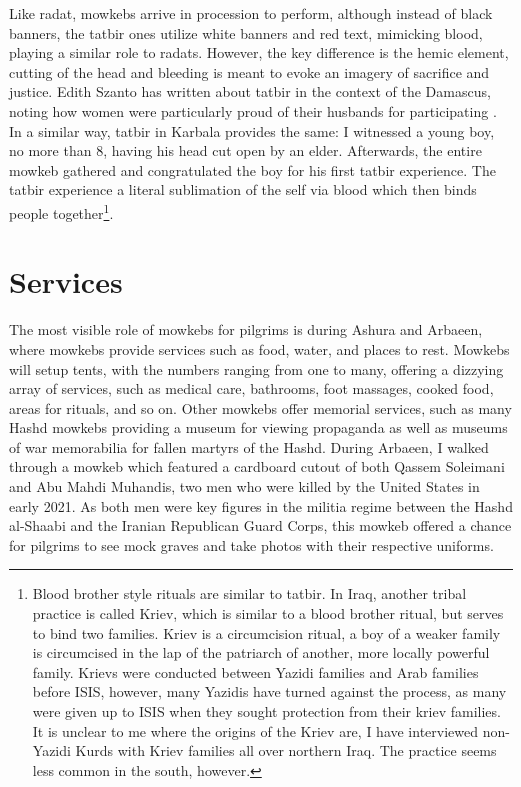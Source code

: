 Like radat, mowkebs arrive in procession to perform, although instead of black banners, the tatbir ones utilize white banners and red text, mimicking blood, playing a similar role to radats. However, the key difference is the hemic element, cutting of the head and bleeding is meant to evoke an imagery of sacrifice and justice. Edith Szanto has written about tatbir in the context of the Damascus, noting how women were particularly proud of their husbands for participating \cite[86]{szanto_beyond_2013}. In a similar way, tatbir in Karbala provides the same: I witnessed a young boy, no more than 8, having his head cut open by an elder. Afterwards, the entire mowkeb gathered and congratulated the boy for his first tatbir experience. The tatbir experience a literal sublimation of the self via blood which then binds people together\footnote{Blood brother style rituals are similar to tatbir. In Iraq, another tribal practice is called Kriev, which is similar to a blood brother ritual, but serves to bind two families. Kriev is a circumcision ritual, a boy of a weaker family is circumcised in the lap of the patriarch of another, more locally powerful family. Krievs were conducted between Yazidi families and Arab families before ISIS, however, many Yazidis have turned against the process, as many were given up to ISIS when they sought protection from their kriev families. It is unclear to me where the origins of the Kriev are, I have interviewed non-Yazidi Kurds with Kriev families all over northern Iraq. The practice seems less common in the south, however.}. 

\section{Services}
The most visible role of mowkebs for pilgrims is during Ashura and Arbaeen, where mowkebs provide services such as food, water, and places to rest. Mowkebs will setup tents, with the numbers ranging from one to many, offering a dizzying array of services, such as medical care, bathrooms, foot massages, cooked food, areas for rituals, and so on. Other mowkebs offer memorial services, such as many Hashd mowkebs providing a museum for viewing propaganda as well as museums of war memorabilia for fallen martyrs of the Hashd. During Arbaeen, I walked through a mowkeb which featured a cardboard cutout of both Qassem Soleimani and Abu Mahdi Muhandis, two men who were killed by the United States in early 2021. As both men were key figures in the militia regime between the Hashd al-Shaabi and the Iranian Republican Guard Corps, this mowkeb offered a chance for pilgrims to see mock graves and take photos with their respective uniforms. 

